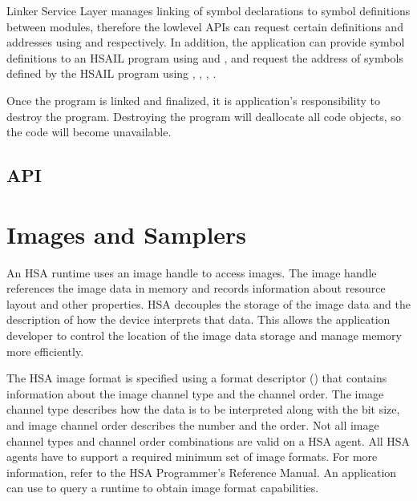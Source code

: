\documentclass[final]{book}
\begin{document}
Linker Service Layer manages linking of symbol declarations to symbol definitions between
modules, therefore the low\-level APIs can request certain definitions and addresses
using  and 
respectively. In addition, the application can provide symbol definitions to an HSAIL program
using  and
, and request the address of symbols defined by the HSAIL program
using , ,
, .

Once the program is linked and finalized, it is application's responsibility to
destroy the program. Destroying the program will deallocate all code objects, so
the code will become unavailable.

\subsection{API}



\section{Images and Samplers}\label{images}

An HSA runtime uses an image handle  to access
images. The image handle references the image data in memory and records
information about resource layout and other properties. HSA decouples the
storage of the image data and the description of how the device interprets that
data. This allows the application developer to control the location of the
image data storage and manage memory more efficiently.

The HSA image format is specified using a format descriptor
() that contains information about the image
channel type and the channel order. The image channel type describes how the
data is to be interpreted along with the bit size, and image channel order
describes the number and the order. Not all image channel types and channel
order combinations are valid on a HSA agent. All HSA agents have to support a
required minimum set of image formats. For more information, refer to the HSA
Programmer's Reference Manual\cite{prm}. An application can use
 to query a runtime
to obtain image format capabilities.
\end{document}
